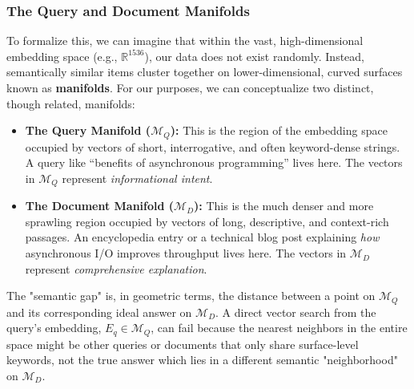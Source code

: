 \documentclass[12pt, a4paper]{article}
\begin{document}
\subsubsection{The Query and Document Manifolds}
To formalize this, we can imagine that within the vast, high-dimensional embedding space (e.g., $\mathbb{R}^{1536}$), our data does not exist randomly. Instead, semantically similar items cluster together on lower-dimensional, curved surfaces known as \textbf{manifolds}. For our purposes, we can conceptualize two distinct, though related, manifolds:
\begin{itemize}
    \item \textbf{The Query Manifold ($\mathcal{M}_Q$):} This is the region of the embedding space occupied by vectors of short, interrogative, and often keyword-dense strings. A query like ``benefits of asynchronous programming'' lives here. The vectors in $\mathcal{M}_Q$ represent \textit{informational intent}.
    \item \textbf{The Document Manifold ($\mathcal{M}_D$):} This is the much denser and more sprawling region occupied by vectors of long, descriptive, and context-rich passages. An encyclopedia entry or a technical blog post explaining \textit{how} asynchronous I/O improves throughput lives here. The vectors in $\mathcal{M}_D$ represent \textit{comprehensive explanation}.
\end{itemize}

The "semantic gap" is, in geometric terms, the distance between a point on $\mathcal{M}_Q$ and its corresponding ideal answer on $\mathcal{M}_D$. A direct vector search from the query's embedding, $E_q \in \mathcal{M}_Q$, can fail because the nearest neighbors in the entire space might be other queries or documents that only share surface-level keywords, not the true answer which lies in a different semantic "neighborhood" on $\mathcal{M}_D$.
\end{document}
